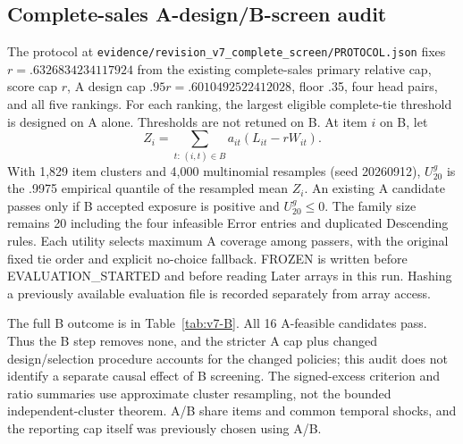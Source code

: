 \subsection{Complete-sales A-design/B-screen audit}
\label{app:v7-screen}
The protocol at \texttt{evidence/revision\_v7\_complete\_screen/PROTOCOL.json} fixes $r=.6326834234117924$ from the existing complete-sales primary relative cap, score cap $r$, A design cap $.95r=.6010492522412028$, floor .35, four head pairs, and all five rankings. For each ranking, the largest eligible complete-tie threshold is designed on A alone. Thresholds are not retuned on B. At item $i$ on B, let
\[
 Z_i=\sum_{t:\,(i,t)\in B} a_{it} (L_{it}-r W_{it}).
\]
With 1,829 item clusters and 4,000 multinomial resamples (seed 20260912), $U^g_{20}$ is the .9975 empirical quantile of the resampled mean $Z_i$. An existing A candidate passes only if B accepted exposure is positive and $U^g_{20}\leq0$. The family size remains 20 including the four infeasible Error entries and duplicated Descending rules. Each utility selects maximum A coverage among passers, with the original fixed tie order and explicit no-choice fallback. FROZEN is written before EVALUATION\_STARTED and before reading Later arrays in this run. Hashing a previously available evaluation file is recorded separately from array access.

The full B outcome is in Table~\ref{tab:v7-B}. All 16 A-feasible candidates pass. Thus the B step removes none, and the stricter A cap plus changed design/selection procedure accounts for the changed policies; this audit does not identify a separate causal effect of B screening. The signed-excess criterion and ratio summaries use approximate cluster resampling, not the bounded independent-cluster theorem. A/B share items and common temporal shocks, and the reporting cap itself was previously chosen using A/B.


